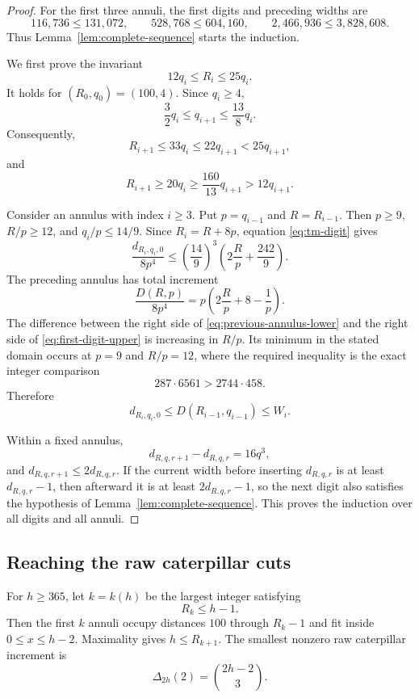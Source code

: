 \documentclass[11pt]{article}
\theoremstyle{definition}
\theoremstyle{remark}
\newcommand{\C}[2]{\binom{#1}{#2}}
\begin{document}
\begin{proof}
For the first three annuli, the first digits and preceding widths are
\[
  116{,}736\le131{,}072,
  \qquad
  528{,}768\le604{,}160,
  \qquad
  2{,}466{,}936\le3{,}828{,}608.
\]
Thus Lemma~\ref{lem:complete-sequence} starts the induction.

We first prove the invariant
\begin{equation}\label{eq:Rq-invariant}
  12q_i\le R_i\le25q_i.
\end{equation}
It holds for $(R_0,q_0)=(100,4)$.  Since $q_i\ge4$,
\[
  \frac32q_i\le q_{i+1}\le\frac{13}{8}q_i.
\]
Consequently,
\[
  R_{i+1}\le33q_i\le22q_{i+1}<25q_{i+1},
\]
and
\[
  R_{i+1}\ge20q_i\ge\frac{160}{13}q_{i+1}>12q_{i+1}.
\]

Consider an annulus with index $i\ge3$.  Put $p=q_{i-1}$ and
$R=R_{i-1}$.  Then $p\ge9$, $R/p\ge12$, and
$q_i/p\le14/9$.  Since $R_i=R+8p$, equation
\eqref{eq:tm-digit} gives
\begin{equation}\label{eq:first-digit-upper}
  \frac{d_{R_i,q_i,0}}{8p^4}
  \le
  \left(\frac{14}{9}\right)^3
  \left(2\frac Rp+\frac{242}{9}\right).
\end{equation}
The preceding annulus has total increment
\begin{equation}\label{eq:previous-annulus-lower}
  \frac{D(R,p)}{8p^4}
  =p\left(2\frac Rp+8-\frac1p\right).
\end{equation}
The difference between the right side of
\eqref{eq:previous-annulus-lower} and the right side of
\eqref{eq:first-digit-upper} is increasing in $R/p$.  Its minimum in the
stated domain occurs at $p=9$ and $R/p=12$, where the required inequality is
the exact integer comparison
\[
  287\cdot6561>2744\cdot458.
\]
Therefore
\[
  d_{R_i,q_i,0}\le D(R_{i-1},q_{i-1})\le W_i.
\]

Within a fixed annulus,
\[
  d_{R,q,r+1}-d_{R,q,r}=16q^3,
\]
and $d_{R,q,r+1}\le2d_{R,q,r}$.  If the current width before inserting
$d_{R,q,r}$ is at least $d_{R,q,r}-1$, then afterward it is at least
$2d_{R,q,r}-1$, so the next digit also satisfies the hypothesis of
Lemma~\ref{lem:complete-sequence}.  This proves the induction over all digits
and all annuli.
\end{proof}

\subsection{Reaching the raw caterpillar cuts}

For $h\ge365$, let $k=k(h)$ be the largest integer satisfying
\begin{equation}\label{eq:k-choice}
  R_k\le h-1.
\end{equation}
Then the first $k$ annuli occupy distances $100$ through $R_k-1$ and fit
inside $0\le x\le h-2$.  Maximality gives $h\le R_{k+1}$.
The smallest nonzero raw caterpillar increment is
\begin{equation}\label{eq:delta2}
  \Delta_{2h}(2)=\C{2h-2}{3}.
\end{equation}
\end{document}
